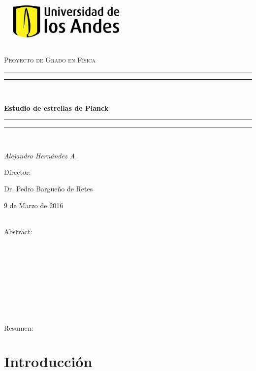 \documentclass{article}
\numberwithin{equation}{section}
\theoremstyle{definition}
\begin{document}
\begin{titlepage}
	\centering
	\vspace*{\baselineskip} 
	\includegraphics[width=0.5\textwidth]{logo_uniandes}\par\vspace{1cm}
	{\scshape\Large Proyecto de Grado en Física\par}
	\vspace{1.5cm}
	\rule{\textwidth}{1.6pt}\vspace*{-\baselineskip}\vspace*{2pt}
	\rule{\textwidth}{0.4pt}\\[\baselineskip]
	{\huge\bfseries Estudio de estrellas de Planck\par}
	\rule{\textwidth}{0.4pt}\vspace*{-\baselineskip}\vspace{3.2pt}
	\rule{\textwidth}{1.6pt}\\[\baselineskip]
	\vspace{2cm}
	{\Large\itshape Alejandro Hernández A.\par}
	\vfill
	Director:\par
	Dr. Pedro Bargueño de Retes 
	\vfill

	{\large 9 de Marzo de 2016\par}
\end{titlepage}


\newpage
\
\\
\huge{Abstract:}\\\\\\\\\\\\\\\\\\\\
\huge{Resumen:}
\newpage

\newpage
\large
\tableofcontents
\newpage

\normalsize
\section{Introducción}
\end{document}
